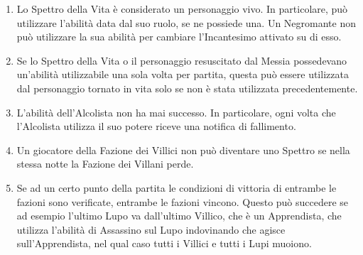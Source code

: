 \documentclass[a4paper,10pt]{article}
\begin{document}
\begin{enumerate}
	\item Lo Spettro della Vita è considerato un personaggio vivo. In particolare, può utilizzare l'abilità data dal suo ruolo, se ne possiede una. Un Negromante non può utilizzare la sua abilità per cambiare l'Incantesimo attivato su di esso.

	\item Se lo Spettro della Vita o il personaggio resuscitato dal Messia possedevano un'abilità utilizzabile una sola volta per partita, questa può essere utilizzata dal personaggio tornato in vita solo se non è stata utilizzata precedentemente.



	\item L'abilità dell'Alcolista non ha mai successo. In particolare, ogni volta che l'Alcolista utilizza il suo potere riceve una notifica di fallimento.

	\item Un giocatore della Fazione dei Villici non può diventare uno Spettro se nella stessa notte la Fazione dei Villani perde.

	\item Se ad un certo punto della partita le condizioni di vittoria di entrambe le fazioni sono verificate, entrambe le fazioni vincono. Questo può succedere se ad esempio l'ultimo Lupo va dall'ultimo Villico, che è un Apprendista, che utilizza l'abilità di Assassino sul Lupo indovinando che agisce sull'Apprendista, nel qual caso tutti i Villici e tutti i Lupi muoiono.




\end{enumerate}
\end{document}
